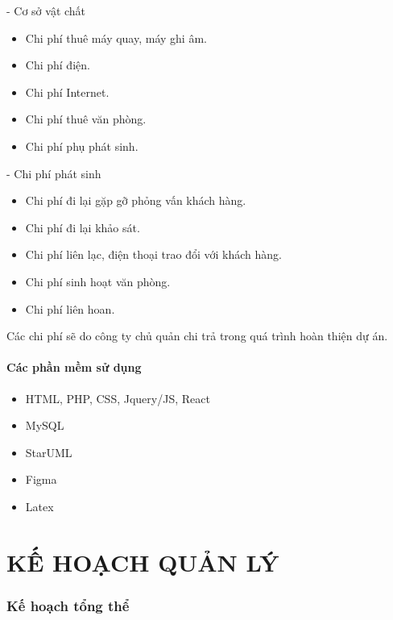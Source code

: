 \documentclass[12pt]{article}
\begin{document}
\hspace{0.3cm}- Cơ sở vật chất
\begin{itemize}[label=+, leftmargin=2cm]
\item Chi phí thuê máy quay, máy ghi âm.
\item Chi phí điện.
\item Chi phí Internet.
\item Chi phí thuê văn phòng.
\item Chi phí phụ phát sinh.
\end{itemize}

\hspace{0.3cm}- Chi phí phát sinh
\begin{itemize}[label=+, leftmargin=2cm]
\item Chi phí đi lại gặp gỡ phỏng vấn khách hàng.
\item Chi phí đi lại khảo sát.
\item Chi phí liên lạc, điện thoại trao đổi với khách hàng.
\item Chi phí sinh hoạt văn phòng.
\item Chi phí liên hoan.
\end{itemize}

\faArrowRight \hspace{0.2cm} Các chi phí sẽ do công ty chủ quản chi trả trong quá trình hoàn thiện dự án.

\subsection{Các phần mềm sử dụng}
\begin{itemize}[label=-, leftmargin=1cm]
\item HTML, PHP, CSS, Jquery/JS, React
\item MySQL
\item StarUML
\item Figma
\item Latex
\end{itemize}

\newpage

\part{KẾ HOẠCH QUẢN LÝ}
\setcounter{section}{0}
\section{Kế hoạch tổng thể}
\end{document}

